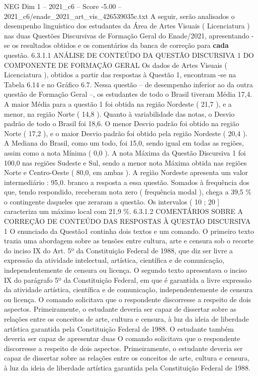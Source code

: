 \begin{textsample}{NEG Dim 1 – 2021\_c6 – Score -5.00 – 2021\_c6/enade\_2021\_art\_vis\_426539035c.txt}
A seguir, serão analisados o desempenho linguístico dos estudantes da Área de Artes Visuais ( Licenciatura ) nas duas Questões Discursivas de Formação Geral do Enade/2021, apresentando -se os resultados obtidos e os comentários da banca de correção para \textbf{cada} questão. 6.3.1.1 ANÁLISE DE CONTEÚDO DA QUESTÃO DISCURSIVA 1 DO COMPONENTE DE FORMAÇÃO GERAL Os dados de Artes Visuais ( Licenciatura ), obtidos a partir das respostas à Questão 1, encontram -se na Tabela 6.14 e no Gráfico 6.7.
Nessa questão – de desempenho inferior ao da outra questão de Formação Geral –, os estudantes de todo o Brasil tiveram Média 17,4.
A maior Média para a questão 1 foi obtida na região Nordeste ( 21,7 ), e a menor, na região Norte ( 14,8 ).
Quanto à variabilidade das notas, o Desvio padrão de todo o Brasil foi 18,6.
O menor Desvio padrão foi obtido na região Norte ( 17,2 ), e o maior Desvio padrão foi obtido pela região Nordeste ( 20,4 ).
A Mediana do Brasil, como um todo, foi 15,0, sendo igual em todas as regiões, assim como a nota Mínima ( 0,0 ).
A nota Máxima da Questão Discursiva 1 foi 100,0 nas regiões Sudeste e Sul, sendo a menor nota Máxima obtida nas regiões Norte e Centro-Oeste ( 80,0, em ambas ).
A região Nordeste apresenta um valor intermediário : 95,0. branco a resposta a essa questão.
Somados à frequência dos que, tendo respondido, receberam nota zero ( frequência modal ), chega a 39,5 \% o contingente daqueles que zeraram a questão.
Os intervalos ( 10 ; 20 ] caracteriza um máximo local com 21,9 \%. 6.3.1.2 COMENTÁRIOS SOBRE A CORREÇÃO DE CONTEÚDO DAS RESPOSTAS À QUESTÃO DISCURSIVA 1 O enunciado da Questão1 continha dois textos e um comando.
O primeiro texto trazia uma abordagem sobre as tensões entre cultura, arte e censura sob o recorte do inciso IX do Art. 5º da Constituição Federal de 1988, que diz ser livre a expressão da atividade intelectual, artística, científica e de comunicação, independentemente de censura ou licença.
O segundo texto apresentava o inciso IX do parágrafo 5º da Constituição Federal, em que é garantida a livre expressão da atividade artística, científica e de comunicação, independentemente de censura ou licença.
O comando solicitava que o respondente discorresse a respeito de dois aspectos.
Primeiramente, o estudante deveria ser capaz de dissertar sobre as relações entre os conceitos de arte, cultura e censura, à luz da ideia de liberdade artística garantida pela Constituição Federal de 1988.
O estudante também deveria ser capaz de apresentar duas O comando solicitava que o respondente discorresse a respeito de dois aspectos.
Primeiramente, o estudante deveria ser capaz de dissertar sobre as relações entre os conceitos de arte, cultura e censura, à luz da ideia de liberdade artística garantida pela Constituição Federal de 1988.

\end{textsample}
